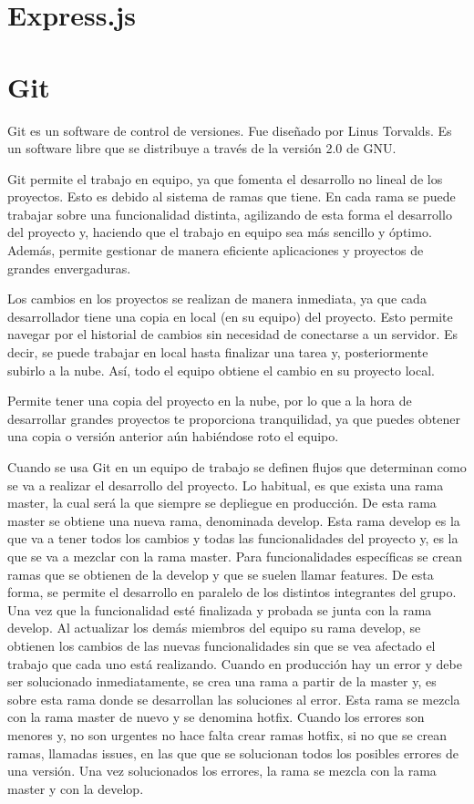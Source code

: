 \documentclass[a4paper, 12pt]{book}
\begin{document}
\section{Express.js} 
\label{sec:Express.js}


\section{Git} 
\label{sec:Git}

Git es un software de control de versiones. Fue diseñado por Linus Torvalds. Es un software libre que se distribuye a través de la versión 2.0 de GNU. 

Git permite el trabajo en equipo, ya que fomenta el desarrollo no lineal de los proyectos. Esto es debido al sistema de ramas que tiene. En cada rama se puede trabajar sobre una funcionalidad distinta, agilizando de esta forma el desarrollo del proyecto y, haciendo que el trabajo en equipo sea más sencillo y óptimo. Además, permite gestionar de manera eficiente aplicaciones y proyectos de grandes envergaduras. 

Los cambios en los proyectos se realizan de manera inmediata, ya que cada desarrollador tiene una copia en local (en su equipo) del proyecto. Esto permite navegar por el historial de cambios sin necesidad de conectarse a un servidor. Es decir, se puede trabajar en local hasta finalizar una tarea y, posteriormente subirlo a la nube. Así, todo el equipo obtiene el cambio en su proyecto local. 

Permite tener una copia del proyecto en la nube, por lo que a la hora de desarrollar grandes proyectos te proporciona tranquilidad, ya que puedes obtener una copia o versión anterior aún habiéndose roto el equipo.

Cuando se usa Git en un equipo de trabajo se definen flujos que determinan como se va a realizar el desarrollo del proyecto. Lo habitual, es que exista una rama master, la cual será la que siempre se depliegue en producción. De esta rama master se obtiene una nueva rama, denominada develop. Esta rama develop es la que va a tener todos los cambios y todas las funcionalidades del proyecto y, es la que se va a mezclar con la rama master. Para funcionalidades específicas se crean ramas que se obtienen de la develop y que se suelen llamar features. De esta forma, se permite el desarrollo en paralelo de los distintos integrantes del grupo. Una vez que la funcionalidad esté finalizada y probada se junta con la rama develop. Al actualizar los demás miembros del equipo su rama develop, se obtienen los cambios de las nuevas funcionalidades sin que se vea afectado el trabajo que cada uno está realizando. Cuando en producción hay un error y debe ser solucionado inmediatamente, se crea una rama a partir de la master y, es sobre esta rama donde se desarrollan las soluciones al error. Esta rama se mezcla con la rama master de nuevo y se denomina hotfix. Cuando los errores son menores y, no son urgentes no hace falta crear ramas hotfix, si no que se crean ramas, llamadas issues, en las que que se solucionan todos los posibles errores de una versión. Una vez solucionados los errores, la rama se mezcla con la rama master y con la develop.
\end{document}
